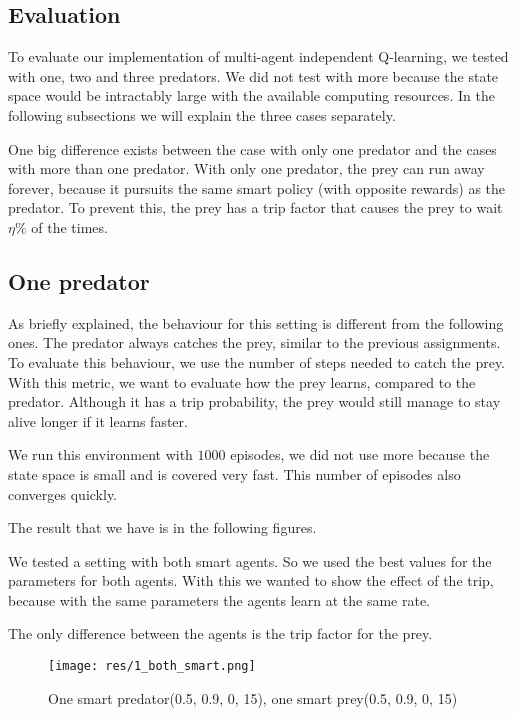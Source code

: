 \documentclass{article}
\begin{document}
\subsection{Evaluation}
To evaluate our implementation of multi-agent independent Q-learning, we tested
with one, two and three predators. We did not test with more because the state
space would be intractably large with the available computing resources. In the
following subsections we will explain the three cases separately.

One big difference exists between the case with only one predator and the cases with
more than one predator. With only one predator, the prey can run away forever, because it pursuits the same smart policy (with opposite rewards) as the predator. To prevent this, the prey has a trip factor that causes the
prey to wait $\eta\%$ of the times.

\subsection{One predator}
As briefly explained, the behaviour for this setting is different from the
following ones. The predator always catches the prey, similar to the previous
assignments. To evaluate this behaviour, we use the number of steps needed to
catch the prey. With this metric, we want to evaluate how the prey learns, compared to
the predator. Although it has a trip probability, the prey would still manage to
stay alive longer if it learns faster.

We run this environment with $1000$ episodes, we did not use more because the
state space is small and is covered very fast. This number of episodes also converges quickly.

The result that we have is in the following figures.

We tested a setting with both smart agents. So we used the best
values for the parameters for both agents. With this we wanted to show the effect
of the trip, because with the same parameters the agents learn at the same rate.

The only difference between the agents is the trip factor for the prey.

\begin{figure}[htbp]
    \centering
    \texttt{[image: res/1\_both\_smart.png]}
    \caption{One smart predator(0.5, 0.9, 0, 15), one smart prey(0.5, 0.9, 0, 15)}
    \label{fig:fig2}
\end{figure}
\end{document}
